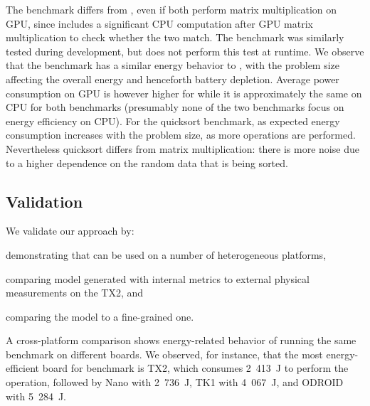 The  benchmark differs from , even if both perform matrix multiplication on GPU, since  includes a significant CPU computation after GPU matrix multiplication to check whether the two match. The  benchmark was similarly tested during development, but does not perform this test at runtime. We observe that the  benchmark has a similar energy behavior to , with the problem size affecting the overall energy and henceforth battery depletion. Average power consumption on GPU is however higher for  while it is approximately the same on CPU for both benchmarks (presumably none of the two benchmarks focus on energy efficiency on CPU). For the quicksort benchmark, as expected energy consumption increases with the problem size, as more operations are performed. Nevertheless quicksort differs from matrix multiplication: %
there is more noise due to a higher dependence on the random data that is being sorted. %

\subsection{\color{cyan}Validation}
\label{sec:experimental-results:validation}

We validate our approach by: 
\begin{enumerate*}[label={\alph*)},font={\bfseries}]
  \item demonstrating that \powprof{} can be used on a number of heterogeneous platforms,
  \item comparing model generated with internal metrics to external physical measurements on the TX2, and
  \item comparing the model to a fine-grained one.
\end{enumerate*}

A cross-platform comparison shows energy-related behavior of running the same benchmark on different boards. We observed, for instance, that the most energy-efficient board for  benchmark is TX2, which consumes 2~413~J to perform the operation, followed by Nano with 2~736~J, TK1 with 4~067~J, and ODROID with 5~284~J.


